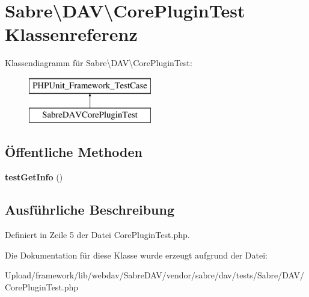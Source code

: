 \hypertarget{class_sabre_1_1_d_a_v_1_1_core_plugin_test}{}\section{Sabre\textbackslash{}D\+AV\textbackslash{}Core\+Plugin\+Test Klassenreferenz}
\label{class_sabre_1_1_d_a_v_1_1_core_plugin_test}
Klassendiagramm für Sabre\textbackslash{}D\+AV\textbackslash{}Core\+Plugin\+Test\+:\begin{figure}[H]
\begin{center}
\leavevmode
\includegraphics[height=2.000000cm]{class_sabre_1_1_d_a_v_1_1_core_plugin_test}
\end{center}
\end{figure}
\subsection*{Öffentliche Methoden}
\begin{DoxyCompactItemize}
\item 
\mbox{\label{class_sabre_1_1_d_a_v_1_1_core_plugin_test_a5c26e213aaf8d12943ff59923472093a}} 
{\bfseries test\+Get\+Info} ()
\end{DoxyCompactItemize}


\subsection{Ausführliche Beschreibung}


Definiert in Zeile 5 der Datei Core\+Plugin\+Test.\+php.



Die Dokumentation für diese Klasse wurde erzeugt aufgrund der Datei\+:\begin{DoxyCompactItemize}
\item 
Upload/framework/lib/webdav/\+Sabre\+D\+A\+V/vendor/sabre/dav/tests/\+Sabre/\+D\+A\+V/Core\+Plugin\+Test.\+php\end{DoxyCompactItemize}
